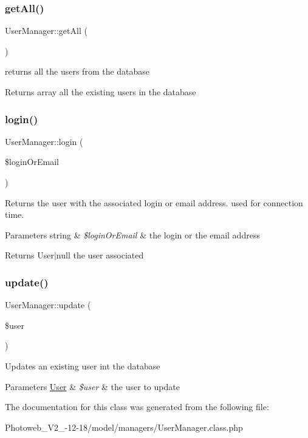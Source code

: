 \subsubsection{\texorpdfstring{get\+All()}{getAll()}}
{\footnotesize\ttfamily User\+Manager\+::get\+All (\begin{DoxyParamCaption}{ }\end{DoxyParamCaption})}

returns all the users from the database \begin{DoxyReturn}{Returns}
array all the existing users in the database 
\end{DoxyReturn}
\mbox{\label{classUserManager_a580f9418a27620a623e858881a2a181a}} 
\subsubsection{\texorpdfstring{login()}{login()}}
{\footnotesize\ttfamily User\+Manager\+::login (\begin{DoxyParamCaption}\item[{}]{\$login\+Or\+Email }\end{DoxyParamCaption})}

Returns the user with the associated login or email address. used for connection time. 
\begin{DoxyParams}[1]{Parameters}
string & {\em \$login\+Or\+Email} & the login or the email address \\
\hline
\end{DoxyParams}
\begin{DoxyReturn}{Returns}
User$\vert$null the user associated 
\end{DoxyReturn}
\mbox{\label{classUserManager_a7f7c60b72d1e89fd33b6192a088b12fb}} 
\subsubsection{\texorpdfstring{update()}{update()}}
{\footnotesize\ttfamily User\+Manager\+::update (\begin{DoxyParamCaption}\item[{}]{\$user }\end{DoxyParamCaption})}

Updates an existing user int the database 
\begin{DoxyParams}[1]{Parameters}
\hyperlink{classUser}{User} & {\em \$user} & the user to update \\
\hline
\end{DoxyParams}


The documentation for this class was generated from the following file\+:\begin{DoxyCompactItemize}
\item 
Photoweb\+\_\+\+V2\+\_-\/12-\/18/model/managers/User\+Manager.\+class.\+php\end{DoxyCompactItemize}
